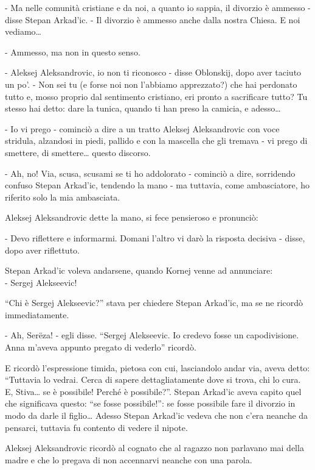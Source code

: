 - Ma nelle comunità cristiane e da noi, a quanto io sappia, il divorzio è ammesso - disse Stepan Arkad'ic. - Il divorzio è ammesso anche dalla nostra Chiesa. E noi vediamo\ldots{} 

- Ammesso, ma non in questo senso. 

- Aleksej Aleksandrovic, io non ti riconosco - disse Oblonskij, dopo aver taciuto un po'. - Non sei tu (e forse noi non l'abbiamo apprezzato?) che hai perdonato tutto e, mosso proprio dal sentimento cristiano, eri pronto a sacrificare tutto? Tu stesso hai detto: dare la tunica, quando ti han preso la camicia, e adesso\ldots{} 

- Io vi prego - cominciò a dire a un tratto Aleksej Aleksandrovic con voce stridula, alzandosi in piedi, pallido e con la mascella che gli tremava - vi prego di smettere, di smettere\ldots{} questo discorso. 
\enlargethispage*{1\baselineskip}

- Ah, no! Via, scusa, scusami se ti ho addolorato - cominciò a dire, sorridendo confuso Stepan Arkad'ic, tendendo la mano - ma tuttavia, come ambasciatore, ho riferito solo la mia ambasciata. 

Aleksej Aleksandrovic dette la mano, si fece pensieroso e pronunciò: 

- Devo riflettere e informarmi. Domani l'altro vi darò la risposta decisiva - disse, dopo aver riflettuto. 

Stepan Arkad'ic voleva andarsene, quando Kornej venne ad annunciare: \\
- Sergej Alekseevic! 

``Chi è Sergej Alekseevic?'' stava per chiedere Stepan Arkad'ic, ma se ne ricordò immediatamente. 

- Ah, Serëza! - egli disse. ``Sergej Alekseevic. Io credevo fosse un capodivisione. Anna m'aveva appunto pregato di vederlo'' ricordò. 

E ricordò l'espressione timida, pietosa con cui, lasciandolo andar via, aveva detto: ``Tuttavia lo vedrai. Cerca di sapere dettagliatamente dove si trova, chi lo cura. E, Stiva\ldots{} se è possibile! Perché è possibile?''. Stepan Arkad'ic aveva capito quel che significava questo: ``se fosse possibile!'': se fosse possibile fare il divorzio in modo da darle il figlio\ldots{} Adesso Stepan Arkad'ic vedeva che non c'era neanche da pensarci, tuttavia fu contento di vedere il nipote. 

Aleksej Aleksandrovic ricordò al cognato che al ragazzo non parlavano mai della madre e che lo pregava di non accennarvi neanche con una parola. 

